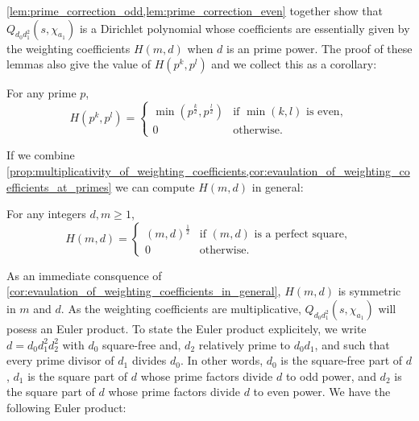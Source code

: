 \documentclass[12pt,reqno,oneside]{amsart}
\begin{document}
    \cref{lem:prime_correction_odd,lem:prime_correction_even} together show that $Q_{d_{0}d_{1}^{2}}(s,\chi_{a_{1}})$ is a Dirichlet polynomial whose coefficients are essentially given by the weighting coefficients $H(m,d)$ when $d$ is an prime power. The proof of these lemmas also give the value of $H(p^{k},p^{l})$ and we collect this as a corollary:

    \begin{corollary}\label{cor:evaulation_of_weighting_coefficients_at_primes}
        For any prime $p$,
        \[
            H(p^{k},p^{l}) = \begin{cases} \min\left(p^{\frac{k}{2}},p^{\frac{l}{2}}\right) & \text{if $\min(k,l)$ is even}, \\ 0 & \text{otherwise}. \end{cases}
        \]
    \end{corollary}

    If we combine \cref{prop:multiplicativity_of_weighting_coefficients,cor:evaulation_of_weighting_coefficients_at_primes} we can compute $H(m,d)$ in general:

    \begin{corollary}\label{cor:evaulation_of_weighting_coefficients_in_general}
        For any integers $d,m \ge 1$,
        \[
            H(m,d) = \begin{cases} (m,d)^{\frac{1}{2}} & \text{if $(m,d)$ is a perfect square}, \\ 0 & \text{otherwise}. \end{cases}
         \]
    \end{corollary}
    
    As an immediate consquence of \cref{cor:evaulation_of_weighting_coefficients_in_general}, $H(m,d)$ is symmetric in $m$ and $d$. As the weighting coefficients are multiplicative, $Q_{d_{0}d_{1}^{2}}(s,\chi_{a_{1}})$ will posess an Euler product. To state the Euler product explicitely, we write $d = d_{0}d_{1}^{2}d_{2}^{2}$ with $d_{0}$ square-free and, $d_{2}$ relatively prime to $d_{0}d_{1}$, and such that every prime divisor of $d_{1}$ divides $d_{0}$. In other words, $d_{0}$ is the square-free part of $d$, $d_{1}$ is the square part of $d$ whose prime factors divide $d$ to odd power, and $d_{2}$ is the square part of $d$ whose prime factors divide $d$ to even power. We have the following Euler product:
\end{document}
